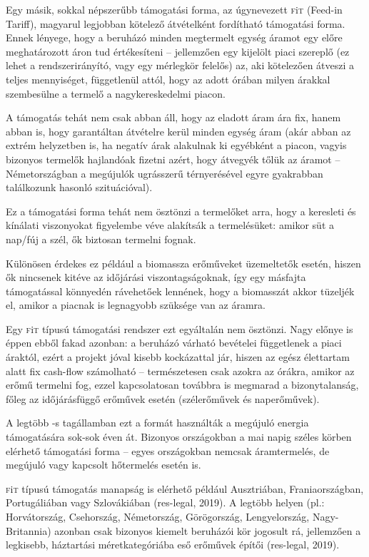 \documentclass[twoside, magyar, showtrims]{corvinusphd}
\theoremstyle{plain}
\theoremstyle{remark}
\theoremstyle{definition}
\newcommand{\fit}{\textsc{f}i\textsc{t}\index{\textsc{f}i\textsc{t}} }
\begin{document}
Egy másik, sokkal népszerűbb támogatási forma,
az úgynevezett \fit (Feed-in Tariff), 
magyarul legjobban kötelező átvételként
fordítható támogatási forma.
Ennek lényege, hogy a beruházó minden
megtermelt egység áramot 
egy előre meghatározott áron tud értékesíteni
-- jellemzően egy kijelölt piaci szereplő
(ez lehet a rendszerirányító, vagy egy mérlegkör felelős)
az, aki kötelezően átveszi a teljes mennyiséget,
függetlenül attól, hogy az adott órában milyen
árakkal szembesülne a termelő a nagykereskedelmi piacon.

A támogatás tehát nem csak abban áll,
hogy az eladott áram ára fix, hanem abban
is, hogy garantáltan átvételre kerül minden
egység áram (akár abban az extrém helyzetben is,
ha negatív árak alakulnak ki egyébként a piacon,
vagyis bizonyos termelők hajlandóak
fizetni azért, hogy átvegyék tőlük az áramot
-- Németországban a megújulók
ugrásszerű térnyerésével egyre gyakrabban
találkozunk hasonló szituációval).

Ez a támogatási forma tehát nem ösztönzi
a termelőket arra, hogy a keresleti és kínálati
viszonyokat figyelembe véve alakítsák a termelésüket:
amikor süt a nap/fúj a szél, ők biztosan termelni fognak.

Különösen érdekes ez például a biomassza erőműveket üzemeltetők
esetén, hiszen ők nincsenek kitéve
az időjárási viszontagságoknak, így egy másfajta
támogatással könnyedén rávehetőek lennének,
hogy a biomasszát akkor tüzeljék el,
amikor a piacnak is legnagyobb szüksége van az áramra.

Egy \fit típusú támogatási rendszer ezt egyáltalán nem ösztönzi.
Nagy előnye is éppen ebből fakad azonban:
a beruházó várható bevételei függetlenek
a piaci áraktól, ezért a projekt jóval kisebb
kockázattal jár, hiszen az egész élettartam
alatt fix cash-flow számolható -- természetesen
csak azokra az órákra, amikor az erőmű termelni fog,
ezzel kapcsolatosan továbbra is megmarad a bizonytalanság,
főleg az időjárásfüggő erőművek esetén
(szélerőművek és naperőművek).

A legtöbb -s tagállamban ezt 
a formát használták a megújuló energia
támogatására sok-sok éven át.
Bizonyos országokban a mai napig széles
körben elérhető támogatási forma
 -- egyes országokban nemcsak áramtermelés,
de megújuló vagy kapcsolt hőtermelés esetén is.

\fit típusú támogatás manapság is elérhető például
Ausztriában, Franiaországban, Portugáliában vagy Szlovákiában
(res-legal, 2019). A legtöbb helyen (pl.: Horvátország,
Csehország, Németország, Görögország,
Lengyelország, Nagy-Britannia)
azonban csak bizonyos kiemelt beruházói kör jogosult rá,
jellemzően a legkisebb,
háztartási méretkategóriába eső erőművek építői (res-legal, 2019).
\end{document}
